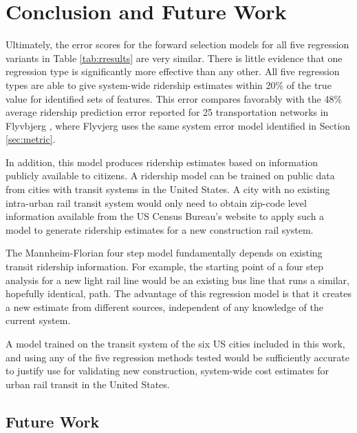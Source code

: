 \documentclass[11pt]{report}
\begin{document}
\chapter{Conclusion and Future Work}\label{sec:acc}

Ultimately, the error scores for the forward selection models for all five regression variants in Table \ref{tab:rresults} are very similar. There is little evidence that one regression type is significantly more effective than any other. All five regression types are able to give system-wide ridership estimates within 20\% of the true value for identified sets of features. This error compares favorably with the 48\% average ridership prediction  error reported for 25 transportation networks in Flyvbjerg \cite{Flyvbjerg2006}, where Flyvjerg uses the same system error model identified in Section \ref{sec:metric}. 

In addition, this model produces ridership estimates based on information publicly available to citizens. A ridership model can be trained on public data from cities with transit systems in the United States. A city with no existing intra-urban rail transit system would only need to obtain zip-code level information available from the US Census Bureau's website to apply such a model to generate ridership estimates for a new construction rail system. 

The Mannheim-Florian four step model fundamentally depends on existing transit ridership information. For example, the starting point of a four step analysis for a new light rail line would be an existing bus line that runs a similar, hopefully identical, path. The advantage of this regression model is that it creates a new estimate from different sources, independent of any knowledge of the current system.

A model trained on the transit system of the six US cities included in this work, and using any of the five regression methods tested would be sufficiently accurate to justify use for validating new construction, system-wide cost estimates for urban rail transit in the United States. 

\section{Future Work}
\end{document}
